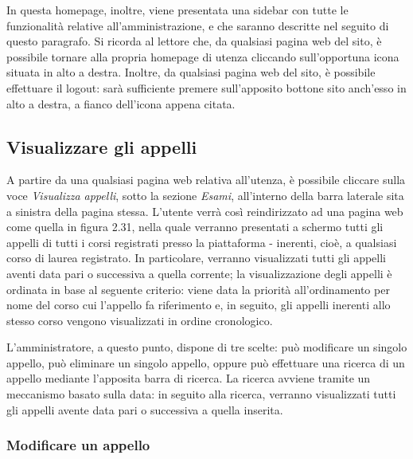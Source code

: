 \documentclass [a4paper,11pt]{book}
\begin{document}

In questa homepage, inoltre, viene presentata una sidebar con tutte le funzionalità relative all'amministrazione, e che saranno descritte nel seguito di questo paragrafo. Si ricorda al lettore che, da qualsiasi pagina web del sito, è possibile tornare alla propria homepage di utenza cliccando sull'opportuna icona situata in alto a destra. Inoltre, da qualsiasi pagina web del sito, è possibile effettuare il logout: sarà sufficiente premere sull'apposito bottone sito anch'esso in alto a destra, a fianco dell'icona appena citata.

\medskip

\subsection{Visualizzare gli appelli}

A partire da una qualsiasi pagina web relativa all'utenza, è possibile cliccare sulla voce \emph{Visualizza appelli}, sotto la sezione \emph{Esami}, all'interno della barra laterale sita a sinistra della pagina stessa. L'utente verrà così reindirizzato ad una pagina web come quella in figura 2.31, nella quale verranno presentati a schermo tutti gli appelli di tutti i corsi registrati presso la piattaforma - inerenti, cioè, a qualsiasi corso di laurea registrato. In particolare, verranno visualizzati tutti gli appelli aventi data pari o successiva a quella corrente; la visualizzazione degli appelli è ordinata in base al seguente criterio: viene data la priorità all'ordinamento per nome del corso cui l'appello fa riferimento e, in seguito, gli appelli inerenti allo stesso corso vengono visualizzati in ordine cronologico.

L'amministratore, a questo punto, dispone di tre scelte: può modificare un singolo appello, può eliminare un singolo appello, oppure può effettuare una ricerca di un appello mediante l'apposita barra di ricerca. La ricerca avviene tramite un meccanismo basato sulla data: in seguito alla ricerca, verranno visualizzati tutti gli appelli avente data pari o successiva a quella inserita.

\medskip

\subsubsection{Modificare un appello}
\end{document}
